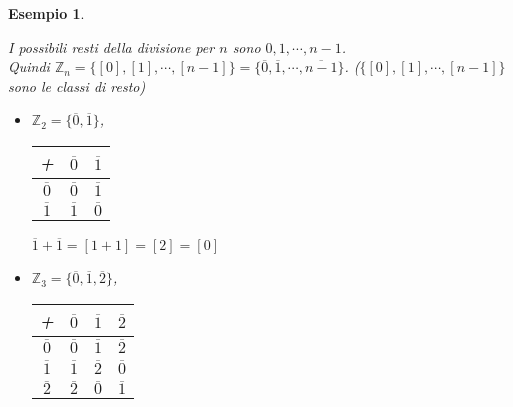 \documentclass[a4paper,12pt]{article}
\theoremstyle{def}
\theoremstyle{prop}
\theoremstyle{esempio}
\newtheorem*{example}{Esempio}
\theoremstyle{dimostrazione}
\theoremstyle{teo}
\theoremstyle{osservazione}
\begin{document}
\begin{example}
\begin{itemize}
              I possibili resti della divisione
              per \(n\) sono \(0,1,\cdots,n-1\).\\
              Quindi \(\mathbb{Z}_n = \{[0],[1],\cdots,[n-1]\} = \{\overline{0}, \overline{1},\cdots,\overline{n - 1}\}\).
              (\(\{[0],[1],\cdots,[n-1]\}\) sono le classi di resto)
              \
              \begin{itemize}
                  \item \(\mathbb{Z}_2 = \{\overline{0},\overline{1}\}\),
                        \begin{table}[htbp]
                            \centering
                            \begin{tabular}{|c|c|c|}
                                \hline
                                +                & \(\overline{0}\) & \(\overline{1}\) \\ \hline
                                \(\overline{0}\) & \(\overline{0}\) & \(\overline{1}\) \\ \hline
                                \(\overline{1}\) & \(\overline{1}\) & \(\overline{0}\) \\ \hline
                            \end{tabular}
                        \end{table}
                        \(\overline{1} + \overline{1} = [1 + 1] = [2] = [0]\)
                  \item \(\mathbb{Z}_3 = \{\overline{0},\overline{1},\overline{2}\}\),
                        \begin{table}[htbp]
                            \centering
                            \begin{tabular}{|c|c|c|c|}
                                \hline
                                +                & \(\overline{0}\) & \(\overline{1}\) & \(\overline{2}\) \\ \hline
                                \(\overline{0}\) & \(\overline{0}\) & \(\overline{1}\) & \(\overline{2}\) \\ \hline
                                \(\overline{1}\) & \(\overline{1}\) & \(\overline{2}\) & \(\overline{0}\) \\ \hline
                                \(\overline{2}\) & \(\overline{2}\) & \(\overline{0}\) & \(\overline{1}\) \\ \hline
                            \end{tabular}
                        \end{table}
              \end{itemize}
    \end{itemize}
\end{example}
\end{document}
